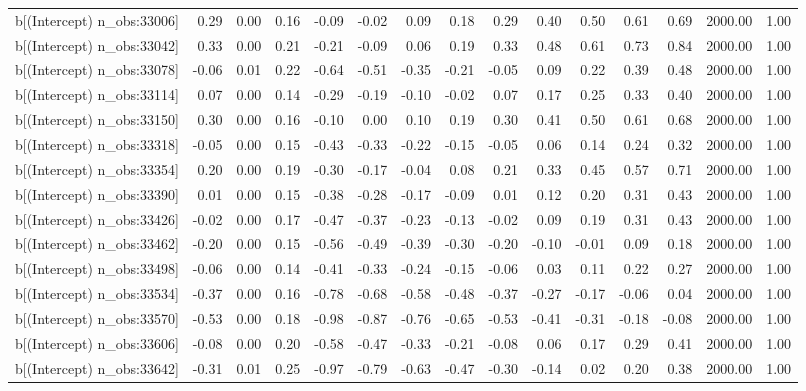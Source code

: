 \begin{table}[ht]
\begin{tabular}{rrrrrrrrrrrrrrr}
  b[(Intercept) n\_obs:33006] & 0.29 & 0.00 & 0.16 & -0.09 & -0.02 & 0.09 & 0.18 & 0.29 & 0.40 & 0.50 & 0.61 & 0.69 & 2000.00 & 1.00 \\ 
  b[(Intercept) n\_obs:33042] & 0.33 & 0.00 & 0.21 & -0.21 & -0.09 & 0.06 & 0.19 & 0.33 & 0.48 & 0.61 & 0.73 & 0.84 & 2000.00 & 1.00 \\ 
  b[(Intercept) n\_obs:33078] & -0.06 & 0.01 & 0.22 & -0.64 & -0.51 & -0.35 & -0.21 & -0.05 & 0.09 & 0.22 & 0.39 & 0.48 & 2000.00 & 1.00 \\ 
  b[(Intercept) n\_obs:33114] & 0.07 & 0.00 & 0.14 & -0.29 & -0.19 & -0.10 & -0.02 & 0.07 & 0.17 & 0.25 & 0.33 & 0.40 & 2000.00 & 1.00 \\ 
  b[(Intercept) n\_obs:33150] & 0.30 & 0.00 & 0.16 & -0.10 & 0.00 & 0.10 & 0.19 & 0.30 & 0.41 & 0.50 & 0.61 & 0.68 & 2000.00 & 1.00 \\ 
  b[(Intercept) n\_obs:33318] & -0.05 & 0.00 & 0.15 & -0.43 & -0.33 & -0.22 & -0.15 & -0.05 & 0.06 & 0.14 & 0.24 & 0.32 & 2000.00 & 1.00 \\ 
  b[(Intercept) n\_obs:33354] & 0.20 & 0.00 & 0.19 & -0.30 & -0.17 & -0.04 & 0.08 & 0.21 & 0.33 & 0.45 & 0.57 & 0.71 & 2000.00 & 1.00 \\ 
  b[(Intercept) n\_obs:33390] & 0.01 & 0.00 & 0.15 & -0.38 & -0.28 & -0.17 & -0.09 & 0.01 & 0.12 & 0.20 & 0.31 & 0.43 & 2000.00 & 1.00 \\ 
  b[(Intercept) n\_obs:33426] & -0.02 & 0.00 & 0.17 & -0.47 & -0.37 & -0.23 & -0.13 & -0.02 & 0.09 & 0.19 & 0.31 & 0.43 & 2000.00 & 1.00 \\ 
  b[(Intercept) n\_obs:33462] & -0.20 & 0.00 & 0.15 & -0.56 & -0.49 & -0.39 & -0.30 & -0.20 & -0.10 & -0.01 & 0.09 & 0.18 & 2000.00 & 1.00 \\ 
  b[(Intercept) n\_obs:33498] & -0.06 & 0.00 & 0.14 & -0.41 & -0.33 & -0.24 & -0.15 & -0.06 & 0.03 & 0.11 & 0.22 & 0.27 & 2000.00 & 1.00 \\ 
  b[(Intercept) n\_obs:33534] & -0.37 & 0.00 & 0.16 & -0.78 & -0.68 & -0.58 & -0.48 & -0.37 & -0.27 & -0.17 & -0.06 & 0.04 & 2000.00 & 1.00 \\ 
  b[(Intercept) n\_obs:33570] & -0.53 & 0.00 & 0.18 & -0.98 & -0.87 & -0.76 & -0.65 & -0.53 & -0.41 & -0.31 & -0.18 & -0.08 & 2000.00 & 1.00 \\ 
  b[(Intercept) n\_obs:33606] & -0.08 & 0.00 & 0.20 & -0.58 & -0.47 & -0.33 & -0.21 & -0.08 & 0.06 & 0.17 & 0.29 & 0.41 & 2000.00 & 1.00 \\ 
  b[(Intercept) n\_obs:33642] & -0.31 & 0.01 & 0.25 & -0.97 & -0.79 & -0.63 & -0.47 & -0.30 & -0.14 & 0.02 & 0.20 & 0.38 & 2000.00 & 1.00 \\ 

\end{tabular}
\end{table}
